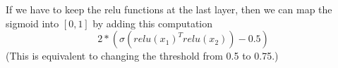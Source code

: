 If we have to keep the relu functions at the last layer, then we can map the sigmoid into $[0,1]$ by adding this computation
$$2*(\sigma (relu(x_1)^T relu(x_2)) - 0.5)$$
(This is equivalent to changing the threshold from 0.5 to 0.75.)